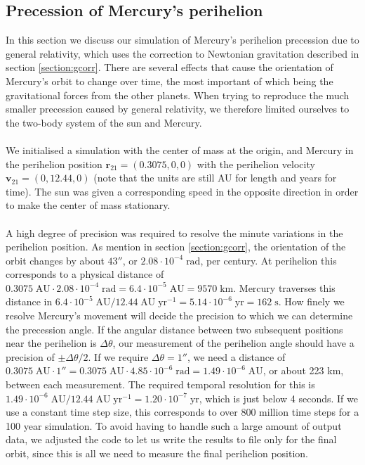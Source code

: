 \documentclass{article}
\newcommand{\mb}[1]{\mathbf{#1}}
\begin{document}
\FloatBarrier
\subsection{Precession of Mercury's perihelion} \label{section:mprec}
In this section we discuss our simulation of Mercury's perihelion precession due to general relativity, which uses the correction to Newtonian gravitation described in section \ref{section:gcorr}. There are several effects that cause the orientation of Mercury's orbit to change over time, the most important of which being the gravitational forces from the other planets. When trying to reproduce the much smaller precession caused by general relativity, we therefore limited ourselves to the two-body system of the sun and Mercury. \\\\
We initialised a simulation with the center of mass at the origin, and Mercury in the perihelion position $\mb{r}_{21} = (0.3075, 0, 0)$ with the perihelion velocity $\mb{v}_{21} = (0, 12.44, 0)$ (note that the units are still AU for length and years for time). The sun was given a corresponding speed in the opposite direction in order to make the center of mass stationary. \\\\
A high degree of precision was required to resolve the minute variations in the perihelion position. As mention in section \ref{section:gcorr}, the orientation of the orbit changes by about $43''$, or $2.08\cdot 10^{-4}\;\text{rad}$, per century. At perihelion this corresponds to a physical distance of $0.3075\;\text{AU}\cdot 2.08\cdot 10^{-4}\;\text{rad} = 6.4\cdot 10^{-5}\;\text{AU} = 9570\;\text{km}$. Mercury traverses this distance in $6.4\cdot 10^{-5}\;\text{AU}/12.44\;\text{AU}\;\text{yr}^{-1} = 5.14\cdot 10^{-6}\;\text{yr} = 162\;\text{s}$. How finely we resolve Mercury's movement will decide the precision to which we can determine the precession angle. If the angular distance between two subsequent positions near the perihelion is $\Delta \theta$, our measurement of the perihelion angle should have a precision of $\pm \Delta \theta/2$. If we require $\Delta \theta = 1''$, we need a distance of $0.3075\;\text{AU}\cdot 1'' = 0.3075\;\text{AU}\cdot 4.85\cdot 10^{-6}\;\text{rad} = 1.49\cdot 10^{-6}\;\text{AU}$, or about 223 km, between each measurement. The required temporal resolution for this is $1.49\cdot 10^{-6}\;\text{AU}/12.44\;\text{AU}\;\text{yr}^{-1} = 1.20\cdot 10^{-7}\;\text{yr}$, which is just below 4 seconds. If we use a constant time step size, this corresponds to over 800 million time steps for a 100 year simulation. To avoid having to handle such a large amount of output data, we adjusted the code to let us write the results to file only for the final orbit, since this is all we need to measure the final perihelion position. \\\\
\end{document}
